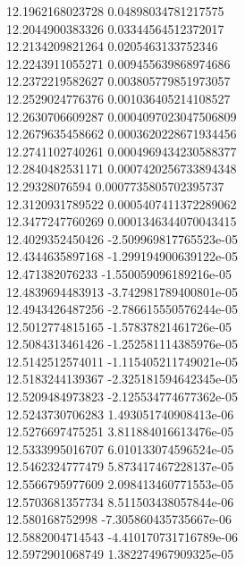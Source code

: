 {12.1962168023728 0.04898034781217575 \\
12.2044900383326 0.03344564512372017 \\
12.2134209821264 0.0205463133752346 \\
12.2243911055271 0.009455639868974686 \\
12.2372219582627 0.003805779851973057 \\
12.2529024776376 0.001036405214108527 \\
12.2630706609287 0.0004097023047506809 \\
12.2679635458662 0.0003620228671934456 \\
12.2741102740261 0.0004969434230588377 \\
12.2840482531171 0.0007420256733894348 \\
12.29328076594 0.0007735805702395737 \\
12.3120931789522 0.0005407411372289062 \\
12.3477247760269 0.0001346344070043415 \\
12.4029352450426 -2.509969817765523e-05 \\
12.4344635897168 -1.299194900639122e-05 \\
12.471382076233 -1.550059096189216e-05 \\
12.4839694483913 -3.742981789400801e-05 \\
12.4943426487256 -2.786615550576244e-05 \\
12.5012774815165 -1.57837821461726e-05 \\
12.5084313461426 -1.252581114385976e-05 \\
12.5142512574011 -1.115405211749021e-05 \\
12.5183244139367 -2.325181594642345e-05 \\
12.5209484973823 -2.125534774677362e-05 \\
12.5243730706283 1.493051740908413e-06 \\
12.5276697475251 3.811884016613476e-05 \\
12.5333995016707 6.010133074596524e-05 \\
12.5462324777479 5.873417467228137e-05 \\
12.5566795977609 2.098413460771553e-05 \\
12.5703681357734 8.511503438057844e-06 \\
12.580168752998 -7.305860435735667e-06 \\
12.5882004714543 -4.410170731716789e-06 \\
12.5972901068749 1.382274967909325e-05 \\
}

